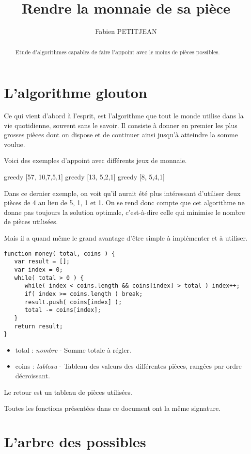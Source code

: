 \documentclass[10pt,a4paper,onecolumn]{article}
\author{Fabien PETITJEAN}
\title{Rendre la monnaie de sa pièce}
\begin{document}
\maketitle

\begin{abstract}
Etude d'algorithmes capables de faire l'appoint avec le moins de pièces possibles.
\end{abstract}

\section{L'algorithme glouton}
Ce qui vient d'abord à l'esprit, est l'algorithme que tout le monde utilise dans la vie quotidienne, souvent sans le savoir. Il consiste à donner en premier les plus grosses pièces dont on dispose et de continuer ainsi jusqu'à atteindre la somme voulue.

Voici des exemples d'appoint avec différents jeux de monnaie.

{{greedy [57, 10,7,5,1]}}
{{greedy [13, 5,2,1]}}
{{greedy [8, 5,4,1]}}

Dans ce dernier exemple, on voit qu'il aurait été plus intéressant d'utiliser deux pièces de 4 au lieu de 5, 1, 1 et 1. On se rend donc compte que cet algorithme ne donne pas toujours la solution optimale, c'est-à-dire celle qui minimise le nombre de pièces utilisées.

Mais il a quand même le grand avantage d'être simple à implémenter et à utiliser.

%
\begin{lstlisting}
function money( total, coins ) {
   var result = [];
   var index = 0;
   while( total > 0 ) {
      while( index < coins.length && coins[index] > total ) index++;
      if( index >= coins.length ) break;
      result.push( coins[index] );
      total -= coins[index];        
   }
   return result;
}
\end{lstlisting}

\begin{itemize}
\item total : {\it nombre} - Somme totale à régler.
\item coins : {\it tableau} - Tableau des valeurs des différentes pièces, rangées par ordre décroissant.
\end{itemize}
Le retour est un tableau de pièces utilisées.

Toutes les fonctions présentées dans ce document ont la même signature.



\section{L'arbre des possibles}
\end{document}
